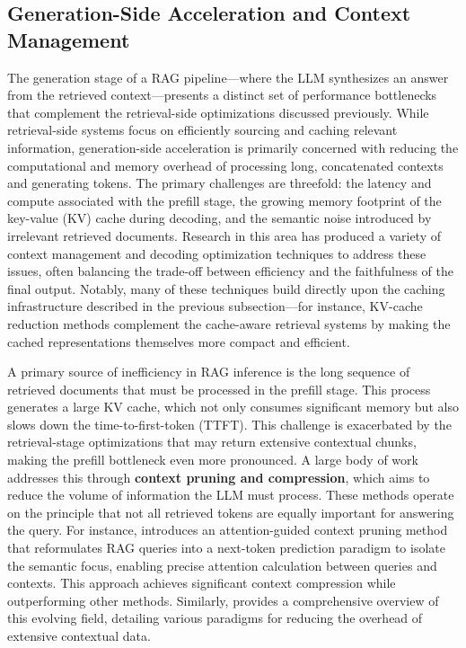 \documentclass[11pt]{article}
\begin{document}
\subsection{Generation-Side Acceleration and Context Management}

The generation stage of a RAG pipeline---where the LLM synthesizes an answer from the retrieved context---presents a distinct set of performance bottlenecks that complement the retrieval-side optimizations discussed previously. While retrieval-side systems focus on efficiently sourcing and caching relevant information, generation-side acceleration is primarily concerned with reducing the computational and memory overhead of processing long, concatenated contexts and generating tokens. The primary challenges are threefold: the latency and compute associated with the prefill stage, the growing memory footprint of the key-value (KV) cache during decoding, and the semantic noise introduced by irrelevant retrieved documents. Research in this area has produced a variety of context management and decoding optimization techniques to address these issues, often balancing the trade-off between efficiency and the faithfulness of the final output. Notably, many of these techniques build directly upon the caching infrastructure described in the previous subsection---for instance, KV-cache reduction methods complement the cache-aware retrieval systems by making the cached representations themselves more compact and efficient.

A primary source of inefficiency in RAG inference is the long sequence of retrieved documents that must be processed in the prefill stage. This process generates a large KV cache, which not only consumes significant memory but also slows down the time-to-first-token (TTFT). This challenge is exacerbated by the retrieval-stage optimizations that may return extensive contextual chunks, making the prefill bottleneck even more pronounced. A large body of work addresses this through \textbf{context pruning and compression}, which aims to reduce the volume of information the LLM must process. These methods operate on the principle that not all retrieved tokens are equally important for answering the query. For instance, \cite{ref157} introduces an attention-guided context pruning method that reformulates RAG queries into a next-token prediction paradigm to isolate the semantic focus, enabling precise attention calculation between queries and contexts. This approach achieves significant context compression while outperforming other methods. Similarly, \cite{ref6} provides a comprehensive overview of this evolving field, detailing various paradigms for reducing the overhead of extensive contextual data.
\end{document}
